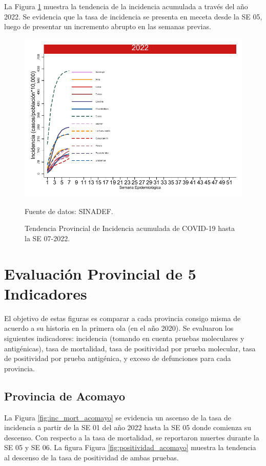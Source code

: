 \documentclass[12pt,a4paper,openany]{book}
\begin{document}
La Figura \ref{fig:incidencia_provincial} muestra la tendencia de la incidencia acumulada a través del año 2022. Se evidencia que la tasa de incidencia se presenta en meceta desde la SE 05, luego de presentar un incremento abrupto en las semanas previas. 
%
\begin{figure}[h]
	\caption{Tendencia Provincial de Incidencia acumulada de COVID-19 hasta la SE 07-2022. }\label{fig:incidencia_provincial}
	\begin{center}
		\includegraphics[width=0.60\linewidth]{../figuras/incidencia_provincial_2022.pdf}
	\end{center}
	{\footnotesize {Fuente de datos: SINADEF.}}
\end{figure}

\clearpage
	
\section*{Evaluación Provincial de 5 Indicadores}
		\noindent El objetivo de estas figuras es comparar a cada provincia consigo misma de acuerdo a su historia  en la primera ola (en el año 2020). Se evaluaron los siguientes indicadores: incidencia (tomando en cuenta pruebas moleculares y antigénicas), tasa de mortalidad, tasa de positividad por prueba molecular, tasa de positividad por prueba antigénica, y exceso de defunciones para cada provincia.
		
		\subsection*{Provincia de Acomayo}
		\noindent La Figura \ref{fig:inc_mort_acomayo} se evidencia un ascenso de la tasa de incidencia a partir de la SE 01 del año 2022 hasta la SE 05 donde comienza su descenso. Con respecto a la tasa de mortalidad, se reportaron muertes durante la SE 05 y SE 06. 
		\noindent La figura Figura \ref{fig:positividad_acomayo} muestra la tendencia al descenso de la tasa de positividad de ambas pruebas. 
		
\end{document}
